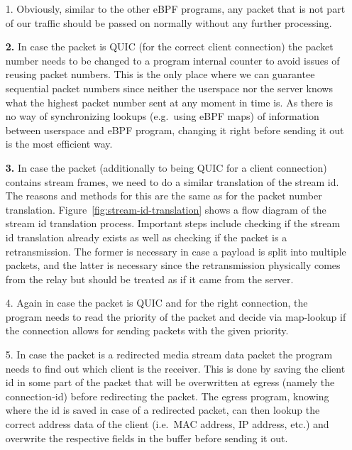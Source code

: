 \begin{enumerate}
    \item[1.]   Obviously, similar to the other eBPF programs, any packet that is not part of our traffic 
            should be passed on normally without any further processing.
    \item[\textbf{2.}] In case the packet is QUIC (for the correct client connection) the packet number 
            needs to be changed to a program internal counter to avoid issues of reusing packet numbers. 
            This is the only place where we can guarantee sequential packet numbers since neither 
            the userspace nor the server knows what the highest packet number sent at any moment in time is. 
            As there is no way of synchronizing lookups (e.g.~using eBPF maps) of information between userspace 
            and eBPF program, changing it right before sending it out is the most efficient way. 
    \item[\textbf{3.}] In case the packet (additionally to being QUIC for a client connection) contains 
                        stream frames, we need to do a similar translation of the stream id.
                        The reasons and methods for this are the same as for the packet number translation.
                        Figure~\ref{fig:stream-id-translation} shows a flow diagram of the stream id translation
                        process.
                        Important steps include checking if the stream id translation already exists as well
                        as checking if the packet is a retransmission.
                        The former is necessary in case a payload is split into multiple packets, and the latter is 
                        necessary since the retransmission physically comes from the relay but should be treated as 
                        if it came from the server.
    \item[4.] Again in case the packet is QUIC and for the right connection, the program needs 
                        to read the priority of the packet and decide via map-lookup if the connection 
                        allows for sending packets with the given priority.
    \item[5.] In case the packet is a redirected media stream data packet the program needs to find out 
            which client is the receiver. 
            This is done by saving the client id in some part of the packet that will be overwritten 
            at egress (namely the connection-id) before redirecting the packet.
            The egress program, knowing where the id is saved in case of a redirected packet, can then
            lookup the correct address data of the client (i.e.~MAC address, IP address, etc.) and
            overwrite the respective fields in the buffer before sending it out.
\end{enumerate}
